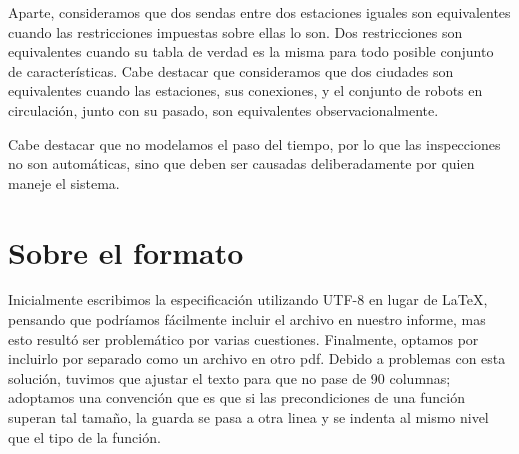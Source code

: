 \documentclass[a4paper,titlepage]{article}
\begin{document}
Aparte, consideramos que dos sendas entre dos estaciones iguales son equivalentes cuando las restricciones impuestas sobre ellas lo son. Dos restricciones son equivalentes cuando su tabla de verdad es la misma para todo posible conjunto de características. Cabe destacar que consideramos que dos ciudades son equivalentes cuando las estaciones, sus conexiones, y el conjunto de robots en circulación, junto con su pasado, son equivalentes observacionalmente.

Cabe destacar que no modelamos el paso del tiempo, por lo que las inspecciones no son automáticas, sino que deben ser causadas deliberadamente por quien maneje el sistema.

\section{Sobre el formato}

Inicialmente escribimos la especificación utilizando UTF-8 en lugar de LaTeX, pensando que podríamos fácilmente incluir el archivo en nuestro informe, mas esto resultó ser problemático por varias cuestiones. Finalmente, optamos por incluirlo por separado como un archivo en otro pdf. Debido a problemas con esta solución, tuvimos que ajustar el texto para que no pase de 90 columnas; adoptamos una convención que es que si las precondiciones de una función superan tal tamaño, la guarda se pasa a otra linea y se indenta al mismo nivel que el tipo de la función.


\end{document}
